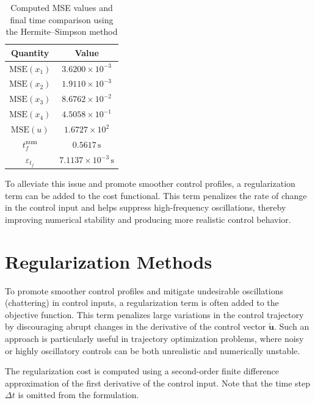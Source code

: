 \begin{table}[H]
\centering
\begin{tabular}{|c|c|}
\hline
\textbf{Quantity} & \textbf{Value} \\
\hline
\( \text{MSE}(x_1) \) & \( 3.6200 \times 10^{-3} \) \\
\( \text{MSE}(x_2) \) & \( 1.9110 \times 10^{-3} \) \\
\( \text{MSE}(x_3) \) & \( 8.6762 \times 10^{-2} \) \\
\( \text{MSE}(x_4) \) & \( 4.5058 \times 10^{-1} \) \\
\( \text{MSE}(u) \)   & \( 1.6727 \times 10^{2} \) \\
\hline
\( t_f^{\text{num}} \) & \( 0.5617 \, \text{s} \) \\
\( \varepsilon_{t_f} \) & \( 7.1137 \times 10^{-3} \, \text{s} \) \\
\hline
\end{tabular}
\caption{Computed MSE values and final time comparison using the Hermite–Simpson method}
\end{table}



To alleviate this issue and promote smoother control profiles, a regularization term can be added to the cost functional. This term penalizes the rate of change in the control input and helps suppress high-frequency oscillations, thereby improving numerical stability and producing more realistic control behavior.



\section{Regularization Methods}

To promote smoother control profiles and mitigate undesirable oscillations (chattering) in control inputs, a regularization term \cite{sanchez2016optimal} is often added to the objective function. This term penalizes large variations in the control trajectory by discouraging abrupt changes in the derivative of the control vector \( \mathbf{\tilde{u}} \). Such an approach is particularly useful in trajectory optimization problems, where noisy or highly oscillatory controls can be both unrealistic and numerically unstable.

The regularization cost is computed using a second-order finite difference approximation of the first derivative of the control input. Note that the time step \( \Delta t \) is omitted from the formulation.

